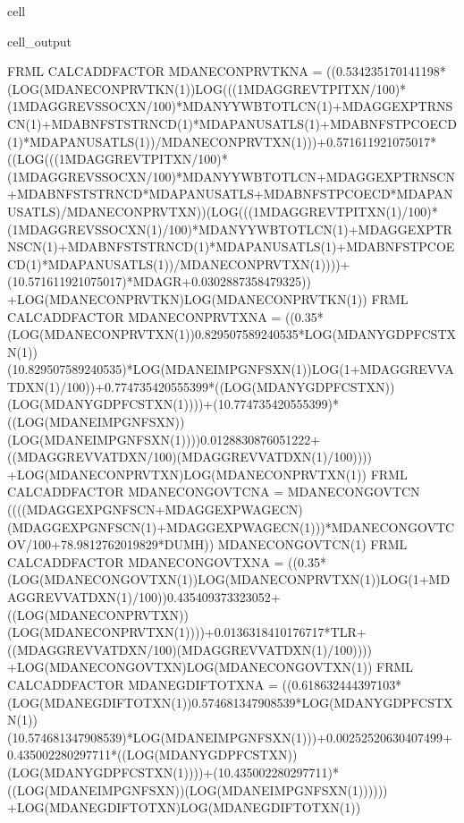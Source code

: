 \documentclass[letterpaper,10pt,english]{jupyterBook}
\begin{document}
\begin{sphinxuseclass}{cell}
\begin{sphinxVerbatimOutput}
\begin{sphinxuseclass}{cell_output}
\begin{sphinxVerbatim}[commandchars=\\\{\}]
FRML \PYGZlt{}CALC\PYGZus{}ADD\PYGZus{}FACTOR\PYGZgt{} MDANECONPRVTKN\PYGZus{}A = \PYGZhy{} ((\PYGZhy{}0.534235170141198*(LOG(MDANECONPRVTKN(\PYGZhy{}1))\PYGZhy{}LOG(((1\PYGZhy{}MDAGGREVTPITXN/100)*(1\PYGZhy{}MDAGGREVSSOCXN/100)*MDANYYWBTOTLCN(\PYGZhy{}1)+MDAGGEXPTRNSCN(\PYGZhy{}1)+MDABNFSTSTRNCD(\PYGZhy{}1)*MDAPANUSATLS(\PYGZhy{}1)+MDABNFSTPCOECD(\PYGZhy{}1)*MDAPANUSATLS(\PYGZhy{}1))/MDANECONPRVTXN(\PYGZhy{}1)))+0.571611921075017*((LOG(((1\PYGZhy{}MDAGGREVTPITXN/100)*(1\PYGZhy{}MDAGGREVSSOCXN/100)*MDANYYWBTOTLCN+MDAGGEXPTRNSCN+MDABNFSTSTRNCD*MDAPANUSATLS+MDABNFSTPCOECD*MDAPANUSATLS)/MDANECONPRVTXN))\PYGZhy{}(LOG(((1\PYGZhy{}MDAGGREVTPITXN(\PYGZhy{}1)/100)*(1\PYGZhy{}MDAGGREVSSOCXN(\PYGZhy{}1)/100)*MDANYYWBTOTLCN(\PYGZhy{}1)+MDAGGEXPTRNSCN(\PYGZhy{}1)+MDABNFSTSTRNCD(\PYGZhy{}1)*MDAPANUSATLS(\PYGZhy{}1)+MDABNFSTPCOECD(\PYGZhy{}1)*MDAPANUSATLS(\PYGZhy{}1))/MDANECONPRVTXN(\PYGZhy{}1))))+(1\PYGZhy{}0.571611921075017)*MDAGR+0.0302887358479325)) +LOG(MDANECONPRVTKN)\PYGZhy{}LOG(MDANECONPRVTKN(\PYGZhy{}1))\PYGZdl{}
FRML \PYGZlt{}CALC\PYGZus{}ADD\PYGZus{}FACTOR\PYGZgt{} MDANECONPRVTXN\PYGZus{}A = \PYGZhy{} ((\PYGZhy{}0.35*(LOG(MDANECONPRVTXN(\PYGZhy{}1))\PYGZhy{}0.829507589240535*LOG(MDANYGDPFCSTXN(\PYGZhy{}1))\PYGZhy{}(1\PYGZhy{}0.829507589240535)*LOG(MDANEIMPGNFSXN(\PYGZhy{}1))\PYGZhy{}LOG(1+MDAGGREVVATDXN(\PYGZhy{}1)/100))+0.774735420555399*((LOG(MDANYGDPFCSTXN))\PYGZhy{}(LOG(MDANYGDPFCSTXN(\PYGZhy{}1))))+(1\PYGZhy{}0.774735420555399)*((LOG(MDANEIMPGNFSXN))\PYGZhy{}(LOG(MDANEIMPGNFSXN(\PYGZhy{}1))))\PYGZhy{}0.0128830876051222+((MDAGGREVVATDXN/100)\PYGZhy{}(MDAGGREVVATDXN(\PYGZhy{}1)/100)))) +LOG(MDANECONPRVTXN)\PYGZhy{}LOG(MDANECONPRVTXN(\PYGZhy{}1))\PYGZdl{}
FRML \PYGZlt{}CALC\PYGZus{}ADD\PYGZus{}FACTOR\PYGZgt{} MDANECONGOVTCN\PYGZus{}A = MDANECONGOVTCN\PYGZhy{} ((((MDAGGEXPGNFSCN+MDAGGEXPWAGECN)\PYGZhy{}(MDAGGEXPGNFSCN(\PYGZhy{}1)+MDAGGEXPWAGECN(\PYGZhy{}1)))*MDANECONGOVTCOV\PYGZus{}/100+78.9812762019829*DUMH)) \PYGZhy{}MDANECONGOVTCN(\PYGZhy{}1)\PYGZdl{}
FRML \PYGZlt{}CALC\PYGZus{}ADD\PYGZus{}FACTOR\PYGZgt{} MDANECONGOVTXN\PYGZus{}A = \PYGZhy{} ((\PYGZhy{}0.35*(LOG(MDANECONGOVTXN(\PYGZhy{}1))\PYGZhy{}LOG(MDANECONPRVTXN(\PYGZhy{}1))\PYGZhy{}LOG(1+MDAGGREVVATDXN(\PYGZhy{}1)/100))\PYGZhy{}0.435409373323052+((LOG(MDANECONPRVTXN))\PYGZhy{}(LOG(MDANECONPRVTXN(\PYGZhy{}1))))+0.0136318410176717*T\PYGZus{}LR+((MDAGGREVVATDXN/100)\PYGZhy{}(MDAGGREVVATDXN(\PYGZhy{}1)/100)))) +LOG(MDANECONGOVTXN)\PYGZhy{}LOG(MDANECONGOVTXN(\PYGZhy{}1))\PYGZdl{}
FRML \PYGZlt{}CALC\PYGZus{}ADD\PYGZus{}FACTOR\PYGZgt{} MDANEGDIFTOTXN\PYGZus{}A = \PYGZhy{} ((\PYGZhy{}0.618632444397103*(LOG(MDANEGDIFTOTXN(\PYGZhy{}1))\PYGZhy{}0.574681347908539*LOG(MDANYGDPFCSTXN(\PYGZhy{}1))\PYGZhy{}(1\PYGZhy{}0.574681347908539)*LOG(MDANEIMPGNFSXN(\PYGZhy{}1)))+0.00252520630407499+0.435002280297711*((LOG(MDANYGDPFCSTXN))\PYGZhy{}(LOG(MDANYGDPFCSTXN(\PYGZhy{}1))))+(1\PYGZhy{}0.435002280297711)*((LOG(MDANEIMPGNFSXN))\PYGZhy{}(LOG(MDANEIMPGNFSXN(\PYGZhy{}1)))))) +LOG(MDANEGDIFTOTXN)\PYGZhy{}LOG(MDANEGDIFTOTXN(\PYGZhy{}1))\PYGZdl{}

\end{sphinxVerbatim}
\end{sphinxuseclass}
\end{sphinxVerbatimOutput}
\end{sphinxuseclass}
\end{document}
